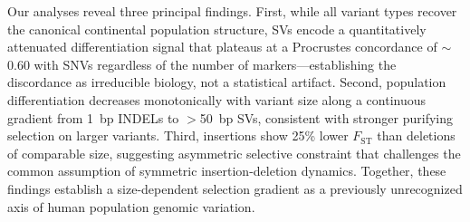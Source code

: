 Our analyses reveal three principal findings. First, while all variant types recover the canonical continental population structure, SVs encode a quantitatively attenuated differentiation signal that plateaus at a Procrustes concordance of $\sim$0.60 with SNVs regardless of the number of markers---establishing the discordance as irreducible biology, not a statistical artifact. Second, population differentiation decreases monotonically with variant size along a continuous gradient from 1~bp INDELs to $>$50~bp SVs, consistent with stronger purifying selection on larger variants. Third, insertions show 25\% lower $F_\mathrm{ST}$ than deletions of comparable size, suggesting asymmetric selective constraint that challenges the common assumption of symmetric insertion-deletion dynamics. Together, these findings establish a size-dependent selection gradient as a previously unrecognized axis of human population genomic variation.
